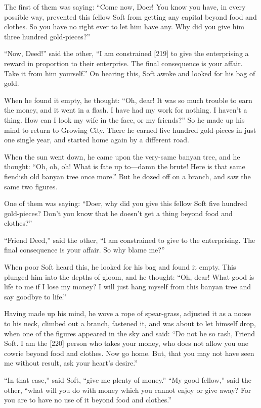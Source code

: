 \documentclass{article}
\begin{document}
The first of them was saying:
``Come now, Doer! You know you have, in every possible way, prevented this fellow Soft from getting any capital beyond food and clothes. So you have no right ever to let him have any. Why did you give him three hundred gold-pieces?''

``Now, Deed!'' said the other,
``I am constrained [219] to give the enterprising a reward in proportion to their enterprise. The final consequence is your affair. Take it from him yourself.''
On hearing this, Soft awoke and looked for his bag of gold.

When he found it empty, he thought:
``Oh, dear! It was so much trouble to earn the money, and it went in a flash. I have had my work for nothing. I haven't a thing. How can I look my wife in the face, or my friends?''
So he made up his mind to return to Growing City. There he earned
five hundred gold-pieces in just one single year, and started home
again by a different road.

When the sun went down, he came upon the very-same banyan tree, and
he thought:
``Oh, oh, oh! What is fate up to---damn the brute! Here is that same fiendish old banyan tree once more.''
But he dozed off on a branch, and saw the same two figures.

One of them was saying:
``Doer, why did you give this fellow Soft five hundred gold-pieces? Don't you know that he doesn't get a thing beyond food and clothes?''

``Friend Deed,'' said the other,
``I am constrained to give to the enterprising. The final consequence is your affair. So why blame me?''

When poor Soft heard this, he looked for his bag and found it
empty. This plunged him into the depths of gloom, and he thought:
``Oh, dear! What good is life to me if I lose my money? I will just hang myself from this banyan tree and say goodbye to life.''

Having made up his mind, he wove a rope of spear-grass, adjusted it
as a noose to his neck, climbed out a branch, fastened it, and was
about to let himself drop, when one of the figures appeared in the
sky and said:
``Do not be so rash, Friend Soft. I am the [220] person who takes your money, who does not allow you one cowrie beyond food and clothes. Now go home. But, that you may not have seen me without result, ask your heart's desire.''

``In that case,'' said Soft, ``give me plenty of money.''
``My good fellow,'' said the other,
``what will you do with money which you cannot enjoy or give away? For you are to have no use of it beyond food and clothes.''
\end{document}
